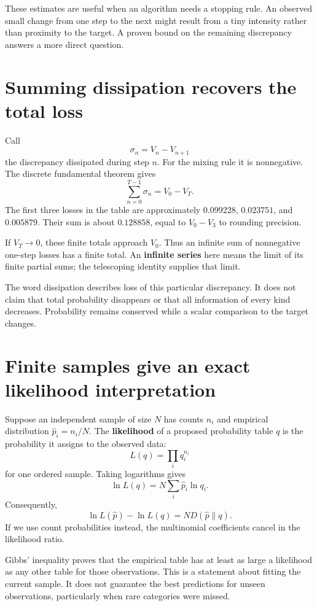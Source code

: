 \documentclass[11pt,oneside,openany]{book}
\theoremstyle{definition}
\theoremstyle{remark}
\numberwithin{equation}{chapter}
\begin{document}
These estimates are useful when an algorithm needs a stopping rule. An observed small change from one step to the next might result from a tiny intensity rather than proximity to the target. A proven bound on the remaining discrepancy answers a more direct question.

\section{Summing dissipation recovers the total loss}\label{ch06-summing-dissipation-recovers-the-total-loss}

Call \[\sigma_n=V_n-V_{n+1}\] the discrepancy dissipated during step \(n\). For the mixing rule it is nonnegative. The discrete fundamental theorem gives \[\boxed{\sum_{n=0}^{T-1}\sigma_n=V_0-V_T.}\] The first three losses in the table are approximately \(0.099228\), \(0.023751\), and \(0.005879\). Their sum is about \(0.128858\), equal to \(V_0-V_3\) to rounding precision.

If \(V_T\to0\), these finite totals approach \(V_0\). Thus an infinite sum of nonnegative one-step losses has a finite total. An \textbf{infinite series} here means the limit of its finite partial sums; the telescoping identity supplies that limit.

The word dissipation describes loss of this particular discrepancy. It does not claim that total probability disappears or that all information of every kind decreases. Probability remains conserved while a scalar comparison to the target changes.

\section{Finite samples give an exact likelihood interpretation}\label{ch06-finite-samples-give-an-exact-likelihood-interpretation}

Suppose an independent sample of size \(N\) has counts \(n_i\) and empirical distribution \(\widehat p_i=n_i/N\). The \textbf{likelihood} of a proposed probability table \(q\) is the probability it assigns to the observed data: \[L(q)=\prod_i q_i^{n_i}\] for one ordered sample. Taking logarithms gives \[\ln L(q)=N\sum_i\widehat p_i\ln q_i.\] Consequently, \[\boxed{\ln L(\widehat p)-\ln L(q)=ND(\widehat p\|q).}\] If we use count probabilities instead, the multinomial coefficients cancel in the likelihood ratio.

Gibbs' inequality proves that the empirical table has at least as large a likelihood as any other table for those observations. This is a statement about fitting the current sample. It does not guarantee the best predictions for unseen observations, particularly when rare categories were missed.
\end{document}

